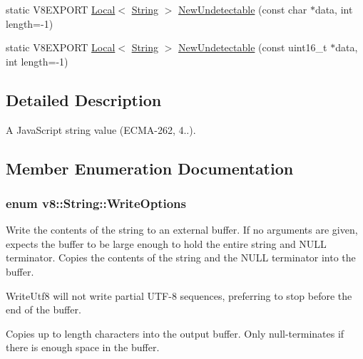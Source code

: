 \begin{DoxyCompactItemize}
\item 
static V8\+E\+X\+P\+O\+R\+T \hyperlink{classv8_1_1_local}{Local}$<$ \hyperlink{classv8_1_1_string}{String} $>$ \hyperlink{classv8_1_1_string_a49b2b16c53998e22f3ad9d06fb49a3fd}{New\+Undetectable} (const char $\ast$data, int length=-\/1)
\item 
static V8\+E\+X\+P\+O\+R\+T \hyperlink{classv8_1_1_local}{Local}$<$ \hyperlink{classv8_1_1_string}{String} $>$ \hyperlink{classv8_1_1_string_a7b39f3e76d0d62a5ca8dafc976599c57}{New\+Undetectable} (const uint16\+\_\+t $\ast$data, int length=-\/1)
\end{DoxyCompactItemize}


\subsection{Detailed Description}
A Java\+Script string value (E\+C\+M\+A-\/262, 4..). 

\subsection{Member Enumeration Documentation}
\hypertarget{classv8_1_1_string_a9ce7f1458ffd08f8eb2b9c8dc056e616}{}
\subsubsection[{Write\+Options}]{\setlength{\rightskip}{0pt plus 5cm}enum {\bf v8\+::\+String\+::\+Write\+Options}}\label{classv8_1_1_string_a9ce7f1458ffd08f8eb2b9c8dc056e616}
Write the contents of the string to an external buffer. If no arguments are given, expects the buffer to be large enough to hold the entire string and N\+U\+L\+L terminator. Copies the contents of the string and the N\+U\+L\+L terminator into the buffer.

Write\+Utf8 will not write partial U\+T\+F-\/8 sequences, preferring to stop before the end of the buffer.

Copies up to length characters into the output buffer. Only null-\/terminates if there is enough space in the buffer.


